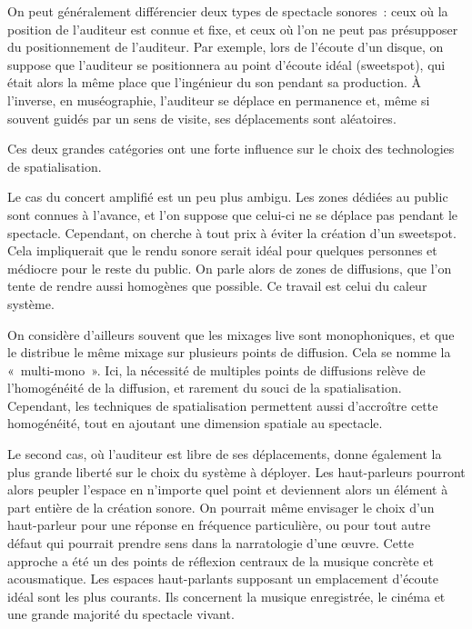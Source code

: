 \documentclass[
  letterpaper,
  DIV=11,
  numbers=noendperiod]{scrreprt}
\begin{document}
On peut généralement différencier deux types de spectacle sonores~: ceux
où la position de l'auditeur est connue et fixe, et ceux où l'on ne peut
pas présupposer du positionnement de l'auditeur. Par exemple, lors de
l'écoute d'un disque, on suppose que l'auditeur se positionnera au point
d'écoute idéal (sweetspot), qui était alors la même place que
l'ingénieur du son pendant sa production. À l'inverse, en muséographie,
l'auditeur se déplace en permanence et, même si souvent guidés par un
sens de visite, ses déplacements sont aléatoires.

Ces deux grandes catégories ont une forte influence sur le choix des
technologies de spatialisation.

\begin{tcolorbox}[enhanced jigsaw, leftrule=.75mm, arc=.35mm, bottomtitle=1mm, colback=white, colbacktitle=quarto-callout-note-color!10!white, opacityback=0, left=2mm, rightrule=.15mm, opacitybacktitle=0.6, breakable, toptitle=1mm, titlerule=0mm, bottomrule=.15mm, toprule=.15mm, coltitle=black, title=\textcolor{quarto-callout-note-color}{\faInfo}\hspace{0.5em}{Note}]

Le cas du concert amplifié est un peu plus ambigu. Les zones dédiées au
public sont connues à l'avance, et l'on suppose que celui-ci ne se
déplace pas pendant le spectacle. Cependant, on cherche à tout prix à
éviter la création d'un sweetspot. Cela impliquerait que le rendu sonore
serait idéal pour quelques personnes et médiocre pour le reste du
public. On parle alors de zones de diffusions, que l'on tente de rendre
aussi homogènes que possible. Ce travail est celui du caleur système.

On considère d'ailleurs souvent que les mixages live sont monophoniques,
et que le distribue le même mixage sur plusieurs points de diffusion.
Cela se nomme la «~multi-mono~». Ici, la nécessité de multiples points
de diffusions relève de l'homogénéité de la diffusion, et rarement du
souci de la spatialisation. Cependant, les techniques de spatialisation
permettent aussi d'accroître cette homogénéité, tout en ajoutant une
dimension spatiale au spectacle.

\end{tcolorbox}

Le second cas, où l'auditeur est libre de ses déplacements, donne
également la plus grande liberté sur le choix du système à déployer. Les
haut-parleurs pourront alors peupler l'espace en n'importe quel point et
deviennent alors un élément à part entière de la création sonore. On
pourrait même envisager le choix d'un haut-parleur pour une réponse en
fréquence particulière, ou pour tout autre défaut qui pourrait prendre
sens dans la narratologie d'une œuvre. Cette approche a été un des
points de réflexion centraux de la musique concrète et acousmatique. Les
espaces haut-parlants supposant un emplacement d'écoute idéal sont les
plus courants. Ils concernent la musique enregistrée, le cinéma et une
grande majorité du spectacle vivant.
\end{document}

